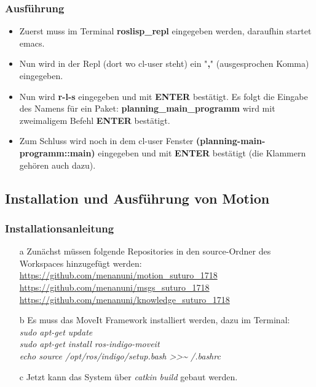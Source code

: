 \documentclass{suturo}
\begin{document}
\subsubsection{Ausführung}
\begin{itemize}

\item Zuerst muss im Terminal \textbf{roslisp\_repl} eingegeben werden, daraufhin startet emacs. 

\item Nun wird in der Repl (dort wo cl-user steht) ein "\textbf{,}" (ausgesprochen Komma) eingegeben.

\item Nun wird \textbf{r-l-s} eingegeben und mit \textbf{ENTER} bestätigt. Es folgt die Eingabe des Namens für ein Paket: \textbf{planning\_main\_programm} wird mit zweimaligem Befehl \textbf{ENTER} bestätigt.

\item Zum Schluss wird noch in dem cl-user Fenster \textbf{(planning-main-programm::main)} eingegeben und mit \textbf{ENTER} bestätigt (die Klammern gehören auch dazu).
\end{itemize}


\subsection{Installation und Ausführung von Motion}

\subsubsection{Installationsanleitung}

\begin{itemize}
\item[a] Zunächst müssen folgende Repositories in den source-Ordner des Workspaces hinzugefügt werden:  \\
\url{https://github.com/menanuni/motion_suturo_1718} \\
\url{https://github.com/menanuni/msgs_suturo_1718} \\
\url{https://github.com/menanuni/knowledge_suturo_1718} \\

\item[b] Es muss das MoveIt Framework installiert werden, dazu im Terminal: \\
\textit{sudo apt-get update} \\
\textit{sudo apt-get install ros-indigo-moveit} \\
\textit{echo  \grqq{}source /opt/ros/indigo/setup.bash\grqq{} \textgreater\textgreater \textasciitilde{ }/.bashrc} \\

\item[c] Jetzt kann das System über \textit{catkin build} gebaut werden.
\end{itemize}
\end{document}
